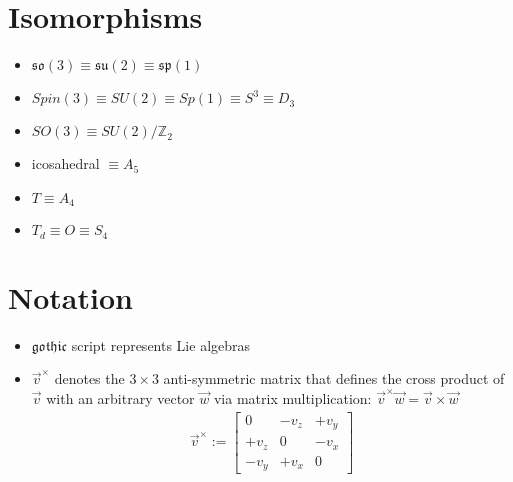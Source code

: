 \documentclass[11pt]{article}
\begin{document}
\section{Isomorphisms}
\begin{itemize}
    \item $\mathfrak{so}(3) \equiv \mathfrak{su}(2) \equiv \mathfrak{sp}(1)$
    \item $Spin(3) \equiv SU(2) \equiv Sp(1) \equiv S^3 \equiv D_3$
    \item $SO(3) \equiv SU(2)/\mathbb{Z}_2$
    \item icosahedral $\equiv A_5$ 
    \item $T \equiv A_4$ 
    \item $T_d \equiv O \equiv S_4$ 
\end{itemize}

\section{Notation}
\begin{itemize}
    \item $\mathfrak{gothic}$ script represents Lie algebras
    \item $\vec{v}^\times$ denotes the $3\times3$ anti-symmetric matrix that defines the cross product of $\vec{v}$ with an arbitrary vector $\vec{w}$ via matrix multiplication: $\vec{v}^\times \vec{w} = \vec{v} \times \vec{w}$
        \begin{align*}
            \vec{v}^\times := 
            \begin{bmatrix}
                0 & -v_z & + v_y \\
                +v_z & 0 & -v_x \\
                -v_y & + v_x & 0 
            \end{bmatrix}
        \end{align*}
\end{itemize}
\end{document}
